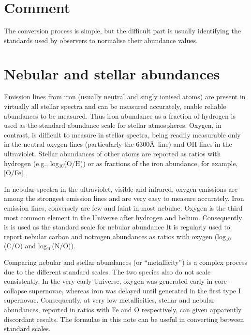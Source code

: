 \section{Comment}
The conversion process is simple, but the difficult part is usually identifying the standards used by observers to normalise their abundance values.

\section{Nebular and stellar abundances}
Emission lines from iron (usually neutral and singly ionised atoms) are present in virtually all stellar spectra and can be measured accurately, enable reliable abundances to be measured. Thus iron abundance as a fraction of hydrogen is used as the standard abundance scale for stellar atmospheres. Oxygen, in contrast, is difficult to measure in stellar spectra, being readily measurable only in the neutral oxygen lines (particularly the 6300\AA\ line) and OH lines in the ultraviolet.  Stellar abundances of other atoms are reported as ratios with hydrogen (e.g., log$_{10}$(O/H)) or as fractions of the iron abundance, for example, [O/Fe].

In nebular spectra in the ultraviolet, visible and infrared, oxygen emissions are among the strongest emission lines and are very easy to measure accurately. Iron emission lines, conversely are few and faint in most nebulae.  Oxygen is the third most common element in the Universe after hydrogen and helium. Consequently is is used as the standard scale for nebular abundance It is regularly used to report nebular carbon and notrogen abundances as ratios with oxygen (log$_{10}$(C/O) and log$_{10}$(N/O)).

Comparing nebular and stellar abundances (or ``metallicity'') is a complex process due to the different standard scales.  The two species also do not scale consistently.  In the very early Universe, oxygen was generated early in core-collapse supernovae, whereas iron was delayed until generated in the first type I supernovae. Consequently, at very low metallicities, stellar and nebular abundances, reported in ratios with Fe and O respectively, can given apparently discordant results.  The formulae in this note can be useful in converting between standard scales.

  
  
  
  
  
  
  
  
  
  
  
  
  